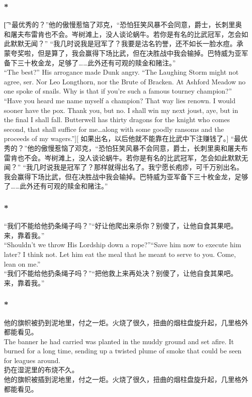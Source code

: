 \documentclass[12pt,a4paper]{article}
\newcommand{\h}[1]{{\color{red}#1}\\}
\newcommand{\la}[1]{{\color{blue}#1}\\}
\begin{document}
\subsubsection{\color{red}*}\t[
	“最优秀的？”他的傲慢惹恼了邓克，“恐怕狂笑风暴不会同意，爵士，长刺里奥和屠夫布雷肯也不会。岑树滩上，没人谈论蜗牛。若你是有名的比武冠军，怎会如此默默无闻？”
	“我几时说我是冠军了？我要是沽名钓誉，还不如长一脸水痘。承蒙夸奖啦，但是算了，我会赢得下场比武，但在决胜战中我会输掉。巴特威为亚军备下三十枚金龙，足够了……此外还有可观的赎金和赌注。”\\
	“The best?” His arrogance made Dunk angry. “The Laughing Storm might not agree, ser. Nor Leo Longthorn, nor the Brute of Bracken. At Ashford Meadow no one spoke of snails. Why is that if you're such a famous tourney champion?”
	“Have you heard me name myself a champion? That way lies renown. I would sooner have the pox. Thank you, but no. I shall win my next joust, aye, but in the final I shall fall. Butterwell has thirty dragons for the knight who comes second, that shall suffice for me\ldots along with some goodly ransoms and the proceeds of my wagers.”][
	如果出名，以后他就不能靠在比武中下注赚钱了。]
	“最优秀的？”他的傲慢惹恼了邓克，“恐怕狂笑风暴不会同意，爵士，长刺里奥和屠夫布雷肯也不会。岑树滩上，没人谈论蜗牛。若你是有名的比武冠军，怎会如此默默无闻？”
	“我几时说我是冠军了？那样就得出名了。我宁愿长疱疹，可千万别出名。我会赢得下场比武，但在决胜战中我会输掉。巴特威为亚军备下三十枚金龙，足够了……此外还有可观的赎金和赌注。”
	
\subsubsection{\color{red}*}\la{
	“我们不能给他扔条绳子吗？”“好让他爬出来杀你？别傻了，让他自食其果吧。来，靠着我。”\\
	“Shouldn't we throw His Lordship down a rope?”“Save him now to execute him later? I think	not. Let him eat the meal that he meant to serve to you. Come, lean on me.”}
	“我们不能给他扔条绳子吗？”“把他救上来再处决？别傻了，让他自食其果吧。来，靠着我。”
	
\subsubsection{\color{red}*}\la{
	他的旗帜被扔到泥地里，付之一炬。火烧了很久，扭曲的烟柱盘旋升起，几里格外都能看见。\\
	The banner he had carried was planted in the muddy ground and set afire. It burned for a long time, sending up a twisted plume of smoke that could be seen for leagues around.}\h{
	扔在湿泥里的布烧不久。}
	他的旗帜被插到泥地里，付之一炬。火烧了很久，扭曲的烟柱盘旋升起，几里格外都能看见。
\end{document}
